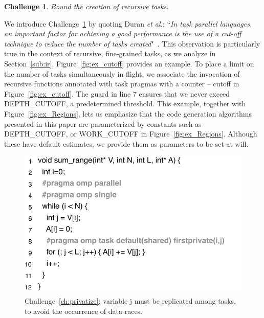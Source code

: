\documentclass[sigplan,10pt,screen]{acmart}
\newtheorem{Challenge}{Challenge}[section]
\begin{document}
\begin{Challenge}
\label{ch:cutoff}
Bound the creation of recursive tasks.
\end{Challenge}

We introduce Challenge~\ref{ch:cutoff} by quoting Duran {\em et al.}:
``{\em In task parallel languages, an important factor for achieving a good
performance is the use of a cut-off technique to reduce the number of tasks
created}"~\cite{Duran08b}.
This observation is particularly true in the context of recursive, fine-grained
tasks, as we analyze in Section~\ref{sub:ir}.
Figure~\ref{fig:ex_cutoff} provides an example.
To place a limit on the number of tasks simultaneously in flight, we associate
the invocation of recursive functions annotated with task pragmas with a
counter -- \textsf{cutoff} in Figure~\ref{fig:ex_cutoff}.
The guard in line 7 ensures that we never exceed \textsf{DEPTH\_CUTOFF}, a
predetermined threshold.
This example, together with Figure~\ref{fig:ex_Regions}, lets us emphasize that
the code generation algorithms presented in this paper are
parameterized by constants such as \textsf{DEPTH\_CUTOFF}, or
\textsf{WORK\_CUTOFF} in Figure~\ref{fig:ex_Regions}. Although these
have default estimates, we provide them as parameters to be set at will.

\begin{figure}[h!]
\begin{center}
\includegraphics[width=1\columnwidth]{images/ex_privatize}
\caption{Challenge~\ref{ch:privatize}: variable \textsf{j} must be replicated among
tasks, to avoid the occurrence of data races.}
\label{fig:ex_privatize}
\end{center}
\end{figure}
\end{document}
